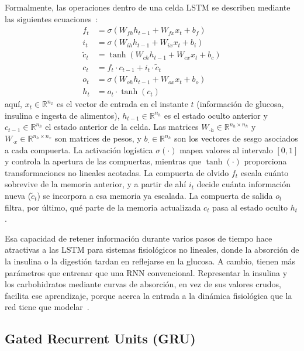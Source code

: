 \documentclass{report}
\begin{document}
Formalmente, las operaciones dentro de una celda LSTM se describen mediante las siguientes ecuaciones~\cite{siami2019performance, sanchez2023realtime}:
\begin{equation}
\label{eq:lstm}
\begin{aligned}
f_t &= \sigma(W_{fh} h_{t-1} + W_{fx} x_t + b_f) \\
i_t &= \sigma(W_{ih} h_{t-1} + W_{ix} x_t + b_i) \\
\tilde{c}_t &= \tanh(W_{ch} h_{t-1} + W_{cx} x_t + b_c) \\
c_t &= f_t \cdot c_{t-1} + i_t \cdot \tilde{c}_t \\
o_t &= \sigma(W_{oh} h_{t-1} + W_{ox} x_t + b_o) \\
h_t &= o_t \cdot \tanh(c_t)
\end{aligned}
\end{equation}
aquí, $x_t \in \mathbb{R}^{n_x}$ es el vector de entrada en el instante $t$ (información de glucosa, insulina e ingesta de alimentos), $h_{t-1} \in \mathbb{R}^{n_h}$ es el estado oculto anterior y $c_{t-1} \in \mathbb{R}^{n_h}$ el estado anterior de la celda. Las matrices $W_{\cdot h} \in \mathbb{R}^{n_h \times n_h}$ y $W_{\cdot x} \in \mathbb{R}^{n_h \times n_x}$ son matrices de pesos, y $b_{\cdot} \in \mathbb{R}^{n_h}$ son los vectores de sesgo asociados a cada compuerta. La activación logística $\sigma(\cdot)$ mapea valores al intervalo $[0, 1]$ y controla la apertura de las compuertas, mientras que $\tanh(\cdot)$ proporciona transformaciones no lineales acotadas. La compuerta de olvido $f_t$ escala cuánto sobrevive de la memoria anterior, y a partir de ahí $i_t$ decide cuánta información nueva ($\tilde{c}_t$) se incorpora a esa memoria ya escalada. La compuerta de salida $o_t$ filtra, por último, qué parte de la memoria actualizada $c_t$ pasa al estado oculto $h_t$.

Esa capacidad de retener información durante varios pasos de tiempo hace atractivas a las LSTM para sistemas fisiológicos no lineales, donde la absorción de la insulina o la digestión tardan en reflejarse en la glucosa. A cambio, tienen más parámetros que entrenar que una RNN convencional. Representar la insulina y los carbohidratos mediante curvas de absorción, en vez de sus valores crudos, facilita ese aprendizaje, porque acerca la entrada a la dinámica fisiológica que la red tiene que modelar~\cite{lindemann2020survey, munoz2021learning}.

\subsection{Gated Recurrent Units (GRU)}
\label{subsec:gru}
\end{document}

